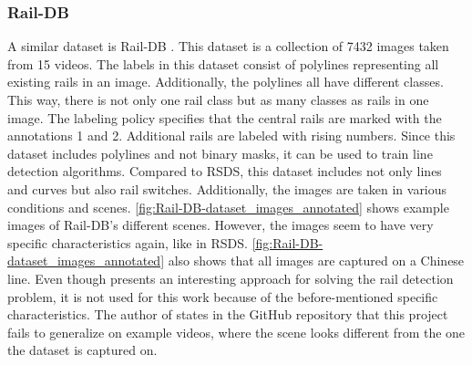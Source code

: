 \subsubsection{Rail-DB}
A similar dataset is Rail-DB \cite{li2022rail}.
This dataset is a collection of 7432 images taken from 15 videos.
The labels in this dataset consist of polylines representing all existing rails in an image.
Additionally, the polylines all have different classes. This way, there is not only one rail class but as many classes as rails in one image.
The labeling policy specifies that the central rails are marked with the annotations 1 and 2.
Additional rails are labeled with rising numbers.
Since this dataset includes polylines and not binary masks, it can be used to train line detection algorithms.
Compared to \ac{RSDS}, this dataset includes not only lines and curves but also rail switches.
Additionally, the images are taken in various conditions and scenes.
\autoref{fig:Rail-DB-dataset_images_annotated} shows example images of Rail-DB's different scenes.
However, the images seem to have very specific characteristics again, like in \ac{RSDS}.
\autoref{fig:Rail-DB-dataset_images_annotated} also shows that all images are captured on a Chinese line.
Even though \cite{li2022rail} presents an interesting approach for solving the rail detection problem,
it is not used for this work because of the before-mentioned specific characteristics. The author of \cite{li2022rail} states in the GitHub repository \cite{railNet2022GitHub}
that this project fails to generalize on example videos, where the scene looks different from the one the dataset is captured on.

